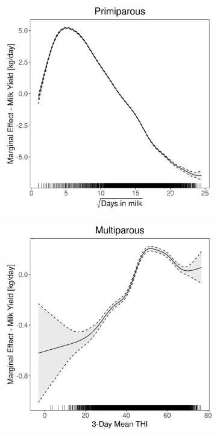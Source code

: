 \begin{figure}[H]
\begin{subfigure}[b]{0.45\textwidth}
    \end{subfigure}
    \hspace{0.05\textwidth} %
    \begin{subfigure}[b]{0.45\textwidth}
        \centering
        \includegraphics[width=\textwidth]{thesis/figures/models/milk/after2010/bs_milk_after2010/bs_milk_after2010_marginal_dim_milk_primi.png}
    \end{subfigure}
    \begin{subfigure}[b]{0.45\textwidth}
        \centering
        \includegraphics[width=\textwidth]{thesis/figures/models/milk/after2010/bs_milk_after2010/bs_milk_after2010_marginal_thi_milk_multi.png}

\end{subfigure}
\end{figure}
